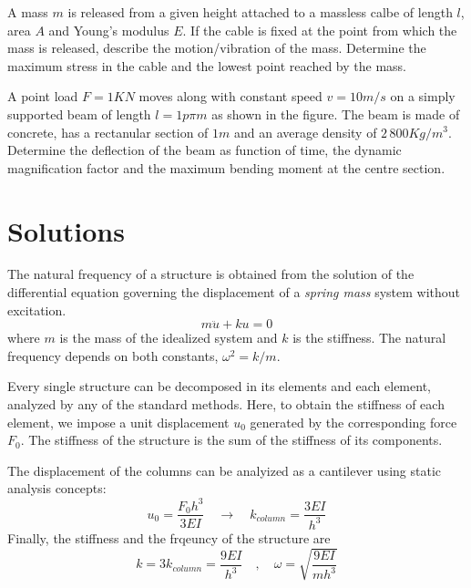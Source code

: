 \documentclass{problems}
\begin{document}
 A mass $m$ is released from a given height attached to a massless calbe of length $l$, area $A$ and Young's modulus $E$. If the cable is fixed at the point from which the mass is released, describe the motion/vibration of the mass. Determine the maximum stress in the cable and the lowest point reached by the mass.


 A point load $F=1KN$ moves along with constant speed $v=10m/s$ on a simply supported beam of length $l=1p\pi m$ as shown in the figure. The beam is made of concrete, has a rectanular section of $1m$ and an average density of $2\,800Kg/m^3$. Determine the deflection of the beam as function of time, the dynamic magnification factor and the maximum bending moment at the centre section.




\newpage
\section{Solutions}


The natural frequency of a structure is obtained from the solution of the differential equation governing the displacement of a \emph{spring mass} system without excitation.
$$
m\ddot{u}+ku=0
$$
where $m$ is the mass of the idealized system and $k$ is the stiffness. The natural frequency depends on both constants, $\omega^2 = k/m$.

Every single structure can be decomposed in its elements and each element, analyzed by any of the standard methods. Here, to obtain the stiffness of each element, we impose a unit displacement $u_0$ generated by the corresponding force $F_0$. The stiffness of the structure is the sum of the stiffness of its components.

\begin{center}
\end{center}

The displacement of the columns can be analyized as a cantilever using static analysis concepts:
$$
u_0 = \frac{F_0h^3}{3EI} \quad \rightarrow \quad k_{column} = \frac{3EI}{h^3}
$$
Finally, the stiffness and the frqeuncy of the structure are
$$
k = 3k_{column} = \frac{9EI}{h^3} \quad , \quad \omega = \sqrt{\frac{9EI}{mh^3}}
$$
\end{document}

